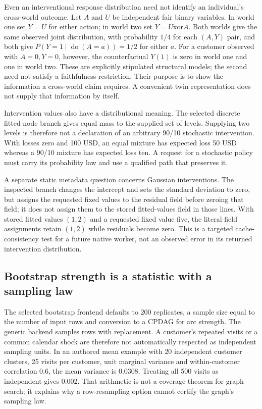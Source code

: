 Even an interventional response distribution need not identify an individual's cross-world outcome. Let $A$ and $U$ be independent fair binary variables. In world one set $Y=U$ for either action; in world two set $Y=U\mathbin{\mathrm{xor}}A$. Both worlds give the same observed joint distribution, with probability $1/4$ for each $(A,Y)$ pair, and both give $P(Y=1\mid\operatorname{do}(A=a))=1/2$ for either $a$. For a customer observed with $A=0,Y=0$, however, the counterfactual $Y(1)$ is zero in world one and one in world two. These are explicitly stipulated structural models; the second need not satisfy a faithfulness restriction. Their purpose is to show the information a cross-world claim requires. A convenient twin representation does not supply that information by itself.~\citep{exec24_bnlearn_contract}

Intervention values also have a distributional meaning. The selected discrete fitted-node branch gives equal mass to the supplied set of levels. Supplying two levels is therefore not a declaration of an arbitrary 90/10 stochastic intervention. With losses zero and 100 USD, an equal mixture has expected loss 50 USD whereas a 90/10 mixture has expected loss ten. A request for a stochastic policy must carry its probability law and use a qualified path that preserves it.~\citep{exec24_bnlearn_sources,exec24_bnlearn_contract}

A separate static metadata question concerns Gaussian interventions. The inspected branch changes the intercept and sets the standard deviation to zero, but assigns the requested fixed values to the residual field before zeroing that field; it does not assign them to the stored fitted-values field in those lines. With stored fitted values $(1,2)$ and a requested fixed value five, the literal field assignments retain $(1,2)$ while residuals become zero. This is a targeted cache-consistency test for a future native worker, not an observed error in its returned intervention distribution.~\citep{exec24_bnlearn_sources,exec24_bnlearn_contract}

\subsection{Bootstrap strength is a statistic with a sampling law}
The selected bootstrap frontend defaults to 200 replicates, a sample size equal to the number of input rows and conversion to a CPDAG for arc strength. The generic backend samples rows with replacement. A customer's repeated visits or a common calendar shock are therefore not automatically respected as independent sampling units. In an authored mean example with 20 independent customer clusters, 25 visits per customer, unit marginal variance and within-customer correlation 0.6, the mean variance is 0.0308. Treating all 500 visits as independent gives 0.002. That arithmetic is not a coverage theorem for graph search; it explains why a row-resampling option cannot certify the graph's sampling law.~\citep{exec24_bnlearn_sources,exec24_bnlearn_contract}

